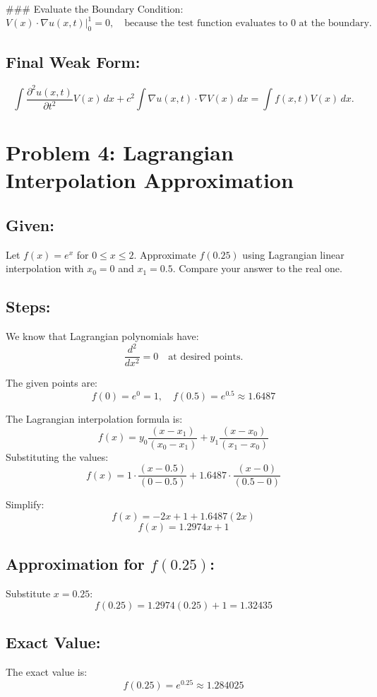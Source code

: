 \documentclass[11pt]{article}
\begin{document}
### Evaluate the Boundary Condition:
\[
V(x) \cdot \nabla u(x, t) \big|_{0}^{1} = 0, \quad \text{because the test function evaluates to 0 at the boundary.}
\]

\subsection*{Final Weak Form:}
\[
\boxed{
\int \frac{\partial^2 u(x, t)}{\partial t^2} V(x) \, dx + c^2 \int \nabla u(x, t) \cdot \nabla V(x) \, dx = \int f(x, t) V(x) \, dx
}.
\]

\section*{Problem 4: Lagrangian Interpolation Approximation}

\subsection*{Given:}
Let \(f(x) = e^x\) for \(0 \leq x \leq 2\). Approximate \(f(0.25)\) using Lagrangian linear interpolation with \(x_0 = 0\) and \(x_1 = 0.5\). Compare your answer to the real one.

\subsection*{Steps:}
We know that Lagrangian polynomials have:
\[
\frac{d^2}{dx^2} = 0 \quad \text{at desired points.}
\]

The given points are:
\[
f(0) = e^0 = 1, \quad f(0.5) = e^{0.5} \approx 1.6487
\]

The Lagrangian interpolation formula is:
\[
f(x) = y_0 \frac{(x - x_1)}{(x_0 - x_1)} + y_1 \frac{(x - x_0)}{(x_1 - x_0)}
\]
Substituting the values:
\[
f(x) = 1 \cdot \frac{(x - 0.5)}{(0 - 0.5)} + 1.6487 \cdot \frac{(x - 0)}{(0.5 - 0)}
\]

Simplify:
\[
f(x) = -2x + 1 + 1.6487(2x)
\]
\[
f(x) = 1.2974x + 1
\]

\subsection*{Approximation for \(f(0.25)\):}
Substitute \(x = 0.25\):
\[
f(0.25) = 1.2974(0.25) + 1 = 1.32435
\]

\subsection*{Exact Value:}
The exact value is:
\[
f(0.25) = e^{0.25} \approx 1.284025
\]
\end{document}
